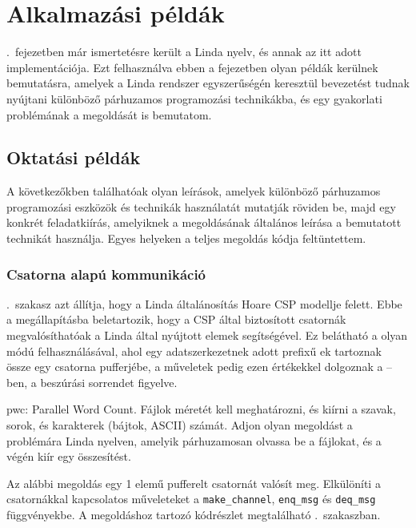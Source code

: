 \chapter{Alkalmazási példák}\label{ch:examples}

.~fejezetben már ismertetésre került a Linda nyelv, és annak az itt adott implementációja.
Ezt felhasználva ebben a fejezetben olyan példák kerülnek bemutatásra, amelyek a Linda rendszer egyszerűségén keresztül bevezetést tudnak nyújtani különböző párhuzamos programozási technikákba, és egy gyakorlati problémának a megoldását is bemutatom.

\section{Oktatási példák}

A következőkben találhatóak olyan leírások, amelyek különböző párhuzamos programozási eszközök és technikák használatát mutatják röviden be, majd egy konkrét feladatkiírás, amelyiknek a megoldásának általános leírása a bemutatott technikát használja.
Egyes helyeken a teljes megoldás kódja feltüntettem.

\subsection{Csatorna alapú kommunikáció}

.~szakasz azt állítja, hogy a Linda általánosítás Hoare CSP modellje felett.
Ebbe a megállapításba beletartozik, hogy a CSP által biztosított csatornák megvalósíthatóak a Linda által nyújtott elemek segítségével.
Ez belátható a \ts{} olyan módú felhasználásával, ahol egy adatszerkezetnek adott prefixű \nes{}ek tartoznak össze egy csatorna pufferjébe, a műveletek pedig ezen értékekkel dolgoznak a \ts--ben, a beszúrási sorrendet figyelve.

\begin{xrcs}
    pwc: Parallel Word Count. Fájlok méretét kell meghatározni, és kiírni a szavak, sorok, és karakterek (bájtok, ASCII) számát.
    Adjon olyan megoldást a problémára Linda nyelven, amelyik párhuzamosan olvassa be a fájlokat, és a végén kiír egy összesítést.
\end{xrcs}

\begin{sln}\label{sln:csp-ch-buf}
    Az alábbi megoldás egy 1 elemű pufferelt csatornát valósít meg. Elkülöníti a csatornákkal kapcsolatos műveleteket a \texttt{make\_channel}, \texttt{enq\_msg} és \texttt{deq\_msg} függvényekbe.
    A megoldáshoz tartozó kódrészlet megtalálható .~szakaszban.
\end{sln}

